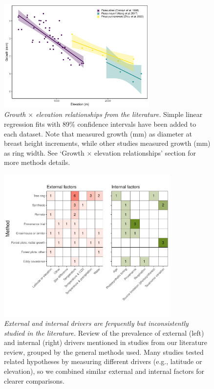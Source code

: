 \documentclass[11pt]{article}
\begin{document}
\begin{figure}[h!]
\includegraphics[width=0.7\textwidth]{..//analyses/growthxelevationetc/figures/growthbyelevation_plot.pdf} %
\caption{\emph{Growth $\times$ elevation relationships from the literature.} Simple linear regression fits with 89\% confidence intervals have been added to each dataset. Note that \cite{oleksyn1998growth} measured growth (mm) as diameter at breast height increments, while other studies \citep{wang2017climatic,zhou2022altitudinal} measured growth (mm) as ring width. See `Growth $\times$ elevation relationships' section for more methods details.} %
\label{fig:gxelev}
\end{figure}

\begin{figure}[h!]
\includegraphics[width=0.8\textwidth]{..//figures/heatmaps/heatmap_combined_endo&exo.pdf}
\caption{\emph{External and internal drivers are ferquently but inconsistently studied in the literature.} Review of the prevalence of external (left) and internal (right) drivers mentioned in studies from our literature review, grouped by the general methods used. Many studies tested related hypotheses by measuring different drivers (e.g., latitude or elevation), so we combined similar external and internal factors for clearer comparisons.}
\label{fig:heatmapssupp}
\end{figure}
\end{document}
